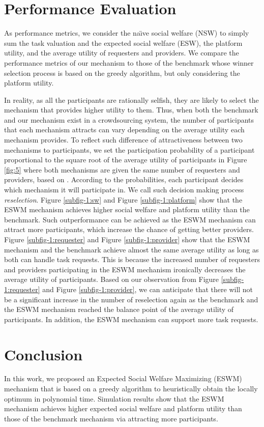 \documentclass[letterpaper]{article} %
\begin{document}
	
	\section{Performance Evaluation}
	\label{part:6}
	As performance metrics, we consider the na\"\i ve social welfare (NSW) to simply sum the task valuation and the expected social welfare (ESW), the platform utility, and the average utility of requesters and providers. We compare the performance metrics of our mechanism to those of the benchmark \cite{team1} whose winner selection process is based on the greedy algorithm, but only considering the platform utility.  
	
	In reality, as all the participants are rationally selfish, they are likely to select the mechanism that provides higher utility to them. Thus, when both the benchmark and our mechanism exist in a crowdsourcing system, the number of participants that each mechanism attracts can vary depending on the average utility each mechanism provides. 
	To reflect such difference of attractiveness between two mechanisms to participants, we set the participation probability of a participant proportional to the square root of the average utility of participants in Figure \ref{fig:5} where both mechanisms are given the same number of requesters and providers, based on \cite{concave}. According to the probabilities, each participant decides which mechanism it will participate in. We call such decision making process  \textit{reselection}. 
	Figure \ref{subfig-1:sw} and Figure \ref{subfig-1:platform} show that the ESWM mechanism achieves higher social welfare and platform utility than the benchmark. Such outperformance can be achieved as the ESWM mechanism can attract more participants, which increase the chance of getting better providers. 
	Figure \ref{subfig-1:requester} and Figure \ref{subfig-1:provider} show that the ESWM mechanism and the benchmark achieve almost the same average utility as long as both can handle task requests. This is because the increased number of requesters and providers participating in the ESWM mechanism ironically decreases the average utility of participants.  
	Based on our observation from Figure \ref{subfig-1:requester} and Figure \ref{subfig-1:provider}, we can anticipate that there will not be a significant increase in the number of reselection again as the benchmark and the ESWM mechanism reached the balance point of the average utility of participants. In addition, the ESWM mechanism can support more task requests. 
		
	\section{Conclusion}
		In this work, we proposed an Expected Social Welfare Maximizing (ESWM) mechanism that is based on a greedy algorithm to heuristically obtain the locally optimum in polynomial time. 
		Simulation results show that the ESWM mechanism achieves higher expected social welfare and platform utility than those of the benchmark mechanism via attracting more participants. 
		
\end{document}
